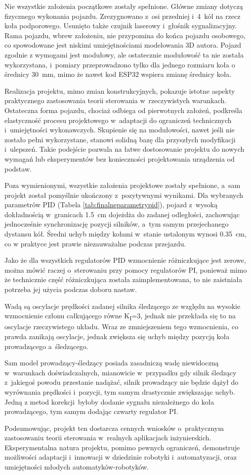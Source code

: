 \label{ch:results}
Nie wszystkie założenia początkowe zostały spełnione. Główne zmiany dotyczą fizycznego wykonania pojazdu. Zrezygnowano z~osi przedniej i~4~kół na rzecz koła podporowego. Usunięto także czujnik laserowy i~głośnik sygnalizacyjny. Rama pojazdu, wbrew założeniu, nie przypomina do końca pojazdu osobowego, co spowodowane jest niskimi umiejętnościami modelowania 3D autora. Pojazd zgodnie z wymogami jest modułowy, ale ostatecznie modułowość ta nie została wykorzystana, i~pomiary przeprowadzono tylko dla jednego rozmiaru koła o średnicy 30~mm, mimo że nawet kod ESP32 wspiera zmianę średnicy koła.

Realizacja projektu, mimo zmian konstrukcyjnych, pokazuje istotne aspekty praktycznego zastosowania teorii sterowania w~rzeczywistych warunkach. Ostateczna forma pojazdu, chociaż odbiega od pierwotnych założeń, podkreśla elastyczność procesu projektowego w~adaptacji do ograniczeń technicznych i~umiejętności wykonawczych. Skupienie się na modułowości, nawet jeśli nie zostało pełni wykorzystane, stanowi solidną bazę dla przyszłych modyfikacji i~ulepszeń. Takie podejście pozwala na łatwe dostosowanie projektu do nowych wymagań lub eksperymentów bez konieczności projektowania urządzenia od podstaw.

Poza wymienionymi, wszystkie założenia projektowe zostały spełnione, a~sam projekt został pomyślnie ukończony z~pozytywnymi wynikami. Dla wybranych parametrów PID (Tabela \ref{tab:finalneparametrypid}), pojazd z~wysoką dokładnością w~granicach 1.5~cm dojeżdża do zadanej odległości, zachowując jednocześnie synchronizację pozycji silników, a~tym samym przejechanego dystansu kół. Średni uchyb między kołami w~stanie ustalonym wynosi 0.35~cm, co w praktyce jest prawie niezauważalne podczas przejazdu.

Jako że dla wszystkich regulatorów PID wzmocnienie różniczkujące jest zerowe, można mówić raczej o~sterowaniu przy pomocy regulatorów PI, ponieważ mimo że technicznie część różniczkująca została zaimplementowana, to nie zaistniała potrzeba jej użycia podczas doboru nastaw.

Wadą są oscylacje prędkości zadanej silnika śledzącego ze względu na wysokie wzmocnienie członu całkującego równe K\textsubscript{I}=3, jednak nie przekłada się to na oscylacje rzeczywistego układu. Wraz ze zmniejszeniem tego wzmocnienia, co prawda zanikają oscylacje, jednak zwiększa się uchyb między pozycją koła prowadzącego a~śledzącego.

Sam model prowadzący-śledzący posiada zasadniczą wadę niewidoczną w~warunkach doświadczalnych, mianowicie w~przypadku gdy silnik śledzący z~jakiegoś powodu przestanie nadążać, silnik prowadzący nie będzie dążył do wyrównania prędkości i~pozycji, tym samym drastycznie zwiększając uchyb. Jedną z metod korekcji~byłoby dodanie sygnału niezależnego do koła prowadzącego, tym samym dodając czwarty regulator PI.

Podsumowując, projekt ten dostarcza cennych wniosków o~praktycznym zastosowaniu teorii sterowania w~realnych aplikacjach inżynierskich. Eksperymentalna natura projektu, pomimo pewnych ograniczeń, demonstruje możliwości adaptacji i~innowacji w dziedzinie robotyki i~automatyzacji, oraz umiejętności młodych automatyków-robotyków.